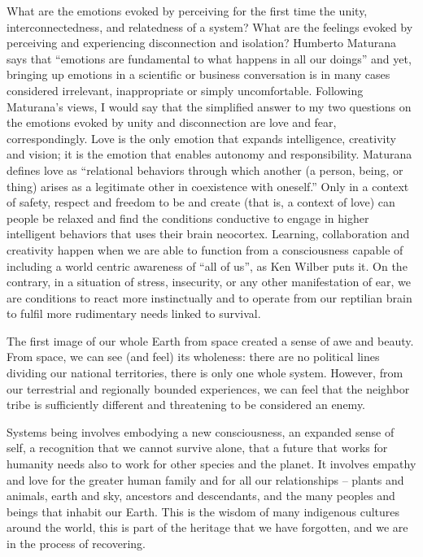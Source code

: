 What are the emotions evoked by perceiving for the first time the unity, interconnectedness, and relatedness of a system?  What are the feelings evoked by perceiving and experiencing disconnection and isolation?  Humberto Maturana says that “emotions are fundamental to what happens in all our doings” and yet, bringing up emotions in a scientific or business conversation is in many cases considered irrelevant, inappropriate or simply uncomfortable. Following Maturana’s views, I would say that the simplified answer to my two questions on the emotions evoked by unity and disconnection are love and fear, correspondingly. Love is the only emotion that expands intelligence, creativity and vision; it is the emotion that enables autonomy and responsibility. Maturana defines love as “relational behaviors through which another (a person, being, or thing) arises as a legitimate other in coexistence with oneself.”  Only in a context of safety, respect and freedom to be and create (that is, a context of love) can people be relaxed and find the conditions conductive to engage in higher intelligent behaviors that uses their brain neocortex. Learning, collaboration and creativity happen when we are able to function from a consciousness capable of including a world centric awareness of “all of us”, as Ken Wilber puts it. On the contrary, in a situation of stress, insecurity, or any other manifestation of ear, we are conditions to react more instinctually and to operate from our reptilian brain to fulfil more rudimentary needs linked to survival.

The first image of our whole Earth from space created a sense of awe and beauty. From space, we can see (and feel) its wholeness: there are no political lines dividing our national territories, there is only one whole system. However, from our terrestrial and regionally bounded experiences, we can feel that the neighbor tribe is sufficiently different and threatening to be considered an enemy.

Systems being involves embodying a new consciousness, an expanded sense of self, a recognition that we cannot survive alone, that a future that works for humanity needs also to work for other species and the planet. It involves empathy and love for the greater human family and for all our relationships – plants and animals, earth and sky, ancestors and descendants, and the many peoples and beings that inhabit our Earth. This is the wisdom of many indigenous cultures around the world, this is part of the heritage that we have forgotten, and we are in the process of recovering.

